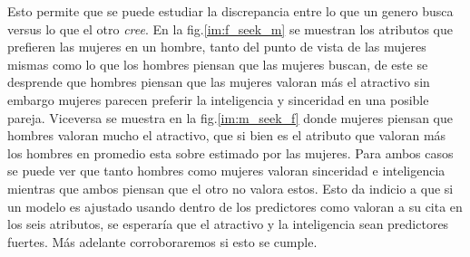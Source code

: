 Esto permite que se puede estudiar la discrepancia entre lo que un genero busca versus lo que el otro \textit{cree}. En la fig.\ref{im:f_seek_m} se muestran los atributos que prefieren las mujeres en un hombre, tanto del punto de vista de las mujeres mismas como lo que los hombres piensan que las mujeres buscan, de este se desprende que hombres piensan que las mujeres valoran más el atractivo sin embargo mujeres parecen preferir la inteligencia y sinceridad en una posible pareja. Viceversa se muestra en la fig.\ref{im:m_seek_f} donde mujeres piensan que hombres valoran mucho el atractivo, que si bien es el atributo que valoran más los hombres en promedio esta sobre estimado por las mujeres. Para ambos casos se puede ver que tanto hombres como mujeres valoran sinceridad e inteligencia mientras que ambos piensan que el otro no valora estos. Esto da indicio a que si un modelo es ajustado usando dentro de los predictores como valoran a su cita en los seis atributos, se esperaría que el atractivo y la inteligencia sean predictores fuertes. Más adelante corroboraremos si esto se cumple.





